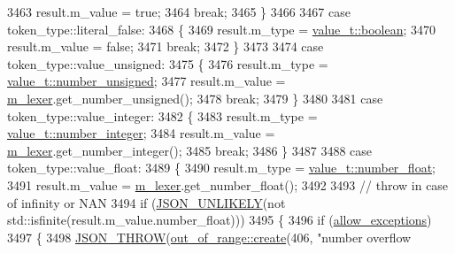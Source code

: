 \begin{DoxyCode}
3463                 result.m\_value = \textcolor{keyword}{true};
3464                 \textcolor{keywordflow}{break};
3465             \}
3466 
3467             \textcolor{keywordflow}{case} token\_type::literal\_false:
3468             \{
3469                 result.m\_type = \hyperlink{namespacenlohmann_1_1detail_a1ed8fc6239da25abcaf681d30ace4985a84e2c64f38f78ba3ea5c905ab5a2da27}{value\_t::boolean};
3470                 result.m\_value = \textcolor{keyword}{false};
3471                 \textcolor{keywordflow}{break};
3472             \}
3473 
3474             \textcolor{keywordflow}{case} token\_type::value\_unsigned:
3475             \{
3476                 result.m\_type = \hyperlink{namespacenlohmann_1_1detail_a1ed8fc6239da25abcaf681d30ace4985adce7cc8ec29055c4158828921f2f265e}{value\_t::number\_unsigned};
3477                 result.m\_value = \hyperlink{classnlohmann_1_1detail_1_1parser_a22dcc815551a4052b87797b34171b352}{m\_lexer}.get\_number\_unsigned();
3478                 \textcolor{keywordflow}{break};
3479             \}
3480 
3481             \textcolor{keywordflow}{case} token\_type::value\_integer:
3482             \{
3483                 result.m\_type = \hyperlink{namespacenlohmann_1_1detail_a1ed8fc6239da25abcaf681d30ace4985a5763da164f8659d94a56e29df64b4bcc}{value\_t::number\_integer};
3484                 result.m\_value = \hyperlink{classnlohmann_1_1detail_1_1parser_a22dcc815551a4052b87797b34171b352}{m\_lexer}.get\_number\_integer();
3485                 \textcolor{keywordflow}{break};
3486             \}
3487 
3488             \textcolor{keywordflow}{case} token\_type::value\_float:
3489             \{
3490                 result.m\_type = \hyperlink{namespacenlohmann_1_1detail_a1ed8fc6239da25abcaf681d30ace4985ad9966ecb59667235a57b4b999a649eef}{value\_t::number\_float};
3491                 result.m\_value = \hyperlink{classnlohmann_1_1detail_1_1parser_a22dcc815551a4052b87797b34171b352}{m\_lexer}.get\_number\_float();
3492 
3493                 \textcolor{comment}{// throw in case of infinity or NAN}
3494                 \textcolor{keywordflow}{if} (\hyperlink{json_8hpp_ab77582407c64944e7db1ea95ab520253}{JSON\_UNLIKELY}(not std::isfinite(result.m\_value.number\_float)))
3495                 \{
3496                     \textcolor{keywordflow}{if} (\hyperlink{classnlohmann_1_1detail_1_1parser_a3de1ea054cfa606e79fa07741f081b5f}{allow\_exceptions})
3497                     \{
3498                         \hyperlink{json_8hpp_a6c274f6db2e65c1b66c7d41b06ad690f}{JSON\_THROW}(\hyperlink{classnlohmann_1_1detail_1_1out__of__range_a3f6d82a6f967c4728a1ec735a7867073}{out\_of\_range::create}(406, \textcolor{stringliteral}{"number overflow
}
\end{DoxyCode}
